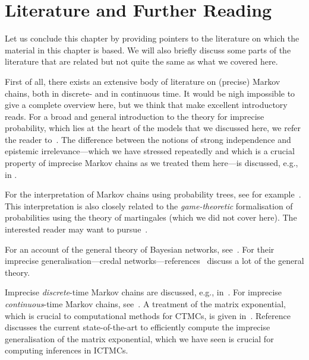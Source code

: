 \documentclass[graybox]{svmult}
\begin{document}
\section{Literature and Further Reading}\label{sec:further_reading}

Let us conclude this chapter by providing pointers to the literature on which the material in this chapter is based. We will also briefly discuss some parts of the literature that are related but not quite the same as what we covered here.

First of all, there exists an extensive body of literature on (precise) Markov chains, both in discrete- and in continuous time. It would be nigh impossible to give a complete overview here, but we think that \cite{anderson1991, norris1998markov} make excellent introductory reads. For a broad and general introduction to the theory for imprecise probability, which lies at the heart of the models that we discussed here, we refer the reader to~\cite{augustin:2014, Walley:1991vk}. The difference between the notions of strong independence and epistemic irrelevance---which we have stressed repeatedly and which is a crucial property of imprecise Markov chains as we treated them here---is discussed, e.g., in \cite{couso:2000, chap_irr_ind:itip:2014}.

For the interpretation of Markov chains using probability trees, see for example~\cite{decooman:2008, destercke:2008, stavros:phd:2017}. This interpretation is also closely related to the \emph{game-theoretic} formalisation of probabilities using the theory of martingales (which we did not cover here). The interested reader may want to pursue~\cite{decooman:2008, stavros:phd:2017, chap:game_theo:itip}.

For an account of the general theory of Bayesian networks, see~\cite{pearl:1988}. For their imprecise generalisation---credal networks---references~\cite{chap_pgm:itip, cozman:2000, cozman:2005, de2015credal, debock:2017} discuss a lot of the general theory.

Imprecise \emph{discrete}-time Markov chains are discussed, e.g., in~\cite{deCooman:2010gd, decooman:2016, augustin2013:itip}. For imprecise \emph{continuous}-time Markov chains, see~\cite{krak2016ictmc, Skulj:2015cq}. A treatment of the matrix exponential, which is crucial to computational methods for CTMCs, is given in~\cite{vanloan:1975}. Reference~\cite{erreygers2017imprecise} discusses the current state-of-the-art to efficiently compute the imprecise generalisation of the matrix exponential, which we have seen is crucial for computing inferences in ICTMCs.
\end{document}
